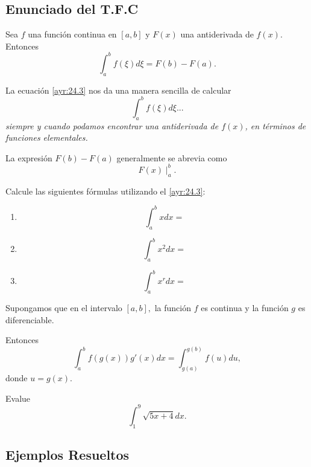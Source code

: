\subsection{Enunciado del T.F.C}


 \begin{teorema}
  Sea $f$ una función continua en $[a,b]$ y
  $F(x)$ una antiderivada de $f(x).$ Entonces
  \[
   \label{ayr:24.3}
   \tag{TFC}
   \int_{a}^{b}f(\xi)d\xi=F(b)-F(a).
  \]

 \end{teorema}




 La ecuación \eqref{ayr:24.3} nos da una manera sencilla de calcular $$\int_{a}^{b}f(\xi)d\xi...$$ \emph{siempre y cuando podamos encontrar una antiderivada de $f(x)$, en términos de funciones elementales.}



 La expresión $F(b)-F(a)$ generalmente se abrevia como $$F(x)\mid_{a}^{b}.$$



 Calcule las siguientes fórmulas utilizando el \eqref{ayr:24.3}:
 \begin{enumerate}
  \item $$\int_{a}^{b}x dx=$$ 
  \item $$\int_{a}^{b}x^{2} dx=$$ 
  \item $$\int_{a}^{b}x^{r} dx=$$
 \end{enumerate}




 \begin{proposicion}
 Supongamos que en el intervalo $[a,b],$ la función $f$ es continua y la función $g$ es diferenciable.

 Entonces{\color{blue}
  $$
  \int_{a}^{b}f(g(x))g'(x)dx=
  \int_{g(a)}^{g(b)}f(u)du,
  $$}
donde {\color{green}$u=g(x).$}
 \end{proposicion}




 \begin{problema}
  \label{ayr:exmp:24.2}
  Evalue $$
  \int_{1}^{9}\sqrt{5x+4}dx.
  $$
 \end{problema}



\subsection{Ejemplos Resueltos}



